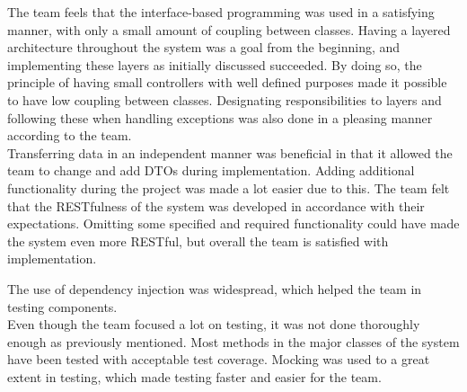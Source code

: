 The team feels that the interface-based programming was used in a satisfying manner, with only a small amount of coupling between classes. Having a layered architecture throughout the system was a goal from the beginning, and implementing these layers as initially discussed succeeded. By doing so, the principle of having small controllers with well defined purposes made it possible to have low coupling between classes. Designating responsibilities to layers and following these when handling exceptions was also done in a pleasing manner according to the team. \\

Transferring data in an independent manner was beneficial in that it allowed the team to change and add DTOs during implementation. Adding additional functionality during the project was made a lot easier due to this. 
The team felt that the RESTfulness of the system was developed in accordance with their expectations. Omitting some specified and required functionality could have made the system even more RESTful, but overall the team is satisfied with implementation. 

The use of dependency injection was widespread, which helped the team in testing components.\\

Even though the team focused a lot on testing, it was not done thoroughly enough as previously mentioned. Most methods in the major classes of the system have been tested with acceptable test coverage. Mocking was used to a great extent in testing, which made testing faster and easier for the team.
